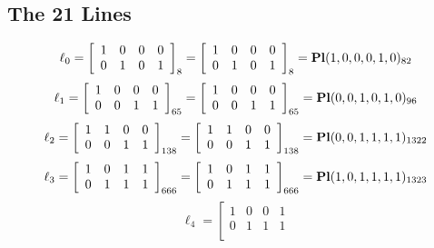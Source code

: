 \documentclass{article}
\begin{document}
{\subsection*{The 21 Lines}
$$
\ell_{0} = 
\left[
\begin{array}{*{4}{r}}
1 & 0 & 0 & 0\\
0 & 1 & 0 & 1\\
\end{array}
\right]
_{8}
=
\left[
\begin{array}{*{4}c}
1  & 0  & 0  & 0\\
0  & 1  & 0  & 1\\
\end{array}
\right]_{8}
={\rm\bf Pl}(1,0,0,0,1,0 )_{82}$$
$$
\ell_{1} = 
\left[
\begin{array}{*{4}{r}}
1 & 0 & 0 & 0\\
0 & 0 & 1 & 1\\
\end{array}
\right]
_{65}
=
\left[
\begin{array}{*{4}c}
1  & 0  & 0  & 0\\
0  & 0  & 1  & 1\\
\end{array}
\right]_{65}
={\rm\bf Pl}(0,0,1,0,1,0 )_{96}$$
$$
\ell_{2} = 
\left[
\begin{array}{*{4}{r}}
1 & 1 & 0 & 0\\
0 & 0 & 1 & 1\\
\end{array}
\right]
_{138}
=
\left[
\begin{array}{*{4}c}
1  & 1  & 0  & 0\\
0  & 0  & 1  & 1\\
\end{array}
\right]_{138}
={\rm\bf Pl}(0,0,1,1,1,1 )_{1322}$$
$$
\ell_{3} = 
\left[
\begin{array}{*{4}{r}}
1 & 0 & 1 & 1\\
0 & 1 & 1 & 1\\
\end{array}
\right]
_{666}
=
\left[
\begin{array}{*{4}c}
1  & 0  & 1  & 1\\
0  & 1  & 1  & 1\\
\end{array}
\right]_{666}
={\rm\bf Pl}(1,0,1,1,1,1 )_{1323}$$
$$
\ell_{4} = 
\left[
\begin{array}{*{4}{r}}
1 & 0 & 0 & 1\\
0 & 1 & 1 & 1\\
\end{array}
$$}
\end{document}
